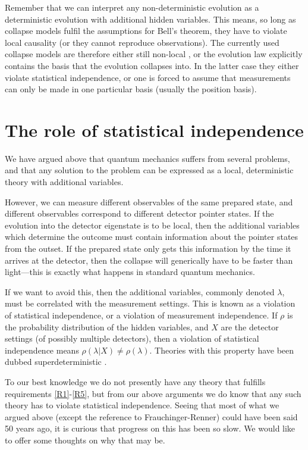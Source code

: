 \documentclass[superscriptaddress,floatfix,nofootinbib,12pt]{revtex4-2}
\begin{document}
Remember that we can interpret any non-deterministic evolution as a deterministic evolution with additional hidden variables. This means, so long as collapse models fulfil the assumptions for Bell's theorem, they have to violate local causality (or they cannot reproduce observations). The currently used collapse models are therefore either still non-local \cite{Tumulka2006RelGRW}, or the evolution law explicitly contains the basis that the evolution collapses into. In the latter case they either violate statistical independence, or one is forced to assume that measurements can only be made in one particular basis (usually the position basis). 

\section{The role of statistical independence}
\label{sec:SI}

We have argued above that quantum mechanics suffers from several problems, and that any solution to the problem can be expressed as a local, deterministic theory with additional variables. 

However, we can measure different observables of the same prepared state, and different observables correspond to different detector pointer states. If the evolution into the detector eigenstate is to be local, then the additional variables which determine the outcome must contain information about the pointer states from the outset. If the prepared state only gets this information by the time it arrives at the detector, then the collapse will generically have to be faster than light---this is exactly what happens in standard quantum mechanics. 

If we want to avoid this, then the additional variables, commonly denoted $\lambda$, must be correlated with the measurement settings. This is known as a violation of statistical independence, or a violation of measurement independence. If $\rho$ is the probability distribution of the hidden variables, and $X$ are the detector settings (of possibly multiple detectors), then a violation of statistical independence means $\rho(\lambda|X) \neq \rho(\lambda)$. Theories with this property have been dubbed superdeterministic \cite{Hossenfelder2020Rethinking,Hossenfelder2020Perplexed}. 

To our best knowledge we do not presently have any theory that fulfills requirements \ref{R1}-\ref{R5}, but from our above arguments we do know that any such theory has to violate statistical independence. Seeing that most of what we argued above (except the reference to Frauchinger-Renner) could have been said 50 years ago, it is curious that progress on this has been so slow. We would like to offer some thoughts on why that may be. 
\end{document}
